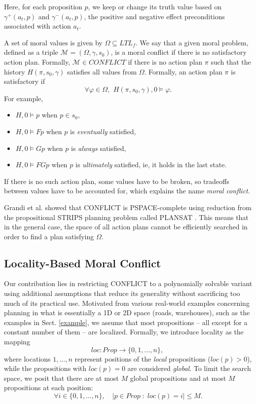 \documentclass[]{jair}
\begin{document}
Here, for each proposition $p$, we keep or change its truth value based on \( \gamma^+(a_t, p) \) and \( \gamma^-(a_t, p) \), the positive and negative effect preconditions associated with action \( a_t \).

A set of moral values is given by $\Omega\subseteq LTL_f$.
We say that a given moral problem, defined as a triple $\mathcal{M}=(\Omega, \gamma, s_0)$, 
is a moral conflict if there is no satisfactory action plan. Formally, $\mathcal{M}\in CONFLICT$
if there is no action plan $\pi$ such that the history $H(\pi, s_0, \gamma)$ satisfies all values
from $\Omega$. Formally, an action plan $\pi$ is satisfactory if
\begin{equation}
\forall \varphi \in \Omega, \, \ H(\pi, s_0, \gamma), 0 \models \varphi.
\end{equation}
For example,
\begin{itemize}
    \item $H, 0\models p$ when $p\in s_0$,
    \item $H, 0\models Fp$ when $p$ is {\it eventually} satisfied,
    \item $H, 0\models Gp$ when $p$ is {\it always} satisfied,
    \item $H, 0\models FGp$ when $p$ is {\it ultimately} satisfied, ie, it holds in the last state.
\end{itemize}
If there is no such action plan, some values have to be broken, so tradeoffs between values have to be accounted for, which explains the name {\it moral conflict}.

 Grandi et al. \cite{grandi2022logic} showed that CONFLICT is PSPACE-complete using reduction from the propositional STRIPS planning problem called PLANSAT \cite{BYLANDER1994165}. This means that in the general case,
 the space of all action plans cannot be efficiently searched in order to find a plan satisfying $\Omega$.

\subsection{Locality-Based Moral Conflict}\label{aa}

Our contribution lies in restricting CONFLICT to a polynomially solvable variant using additional assumptions that reduce its generality without sacrificing too much of its practical use. Motivated from various real-world examples concerning planning in what is essentially a 1D or 2D space (roads, warehouses), such as the examples in Sect. \ref{example}, we assume that most propositions -- all except for a constant number of them -- are localized. Formally, we introduce locality as the mapping 
\begin{equation}
    loc: Prop \to \{0,1, \dots, n\},\  
\end{equation}
where locations $1, \dots, n$ represent positions of the {\it local} propositions ($loc(p)>0$),
while the propositions with $loc(p)=0$ are considered {\it global}.
To limit the search space, we posit that there are at most $M$ global propositions and at most $M$
propositions at each position:
\begin{equation}
    \forall i\in\{0,1,\dots,n\},\quad |p\in Prop \; : \; loc(p)=i|\le M.
\end{equation}
\end{document}
